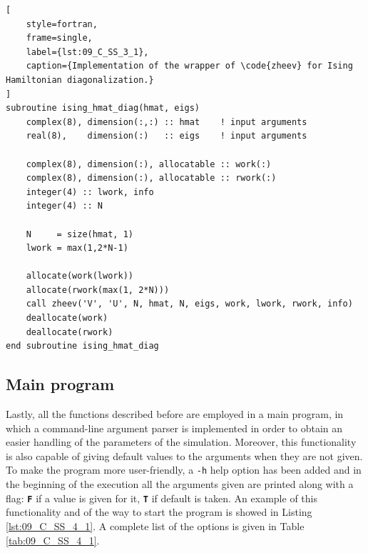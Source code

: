 \documentclass[pra, onecolumn, notitlepage, floats, 11pt]{revtex4-1}
\newcommand{\codebold}[2][cobalt]{\texttt{\bfseries {\color{#1}#2}}}
\newcommand{\code}[2][black]{\color{#1}\texttt{#2}}
\begin{document}
\begin{lstlisting}[
    style=fortran,
    frame=single,
    label={lst:09_C_SS_3_1},
    caption={Implementation of the wrapper of \code{zheev} for Ising Hamiltonian diagonalization.}
]
subroutine ising_hmat_diag(hmat, eigs)
    complex(8), dimension(:,:) :: hmat    ! input arguments
    real(8),    dimension(:)   :: eigs    ! input arguments

    complex(8), dimension(:), allocatable :: work(:)
    complex(8), dimension(:), allocatable :: rwork(:)
    integer(4) :: lwork, info
    integer(4) :: N

    N     = size(hmat, 1)
    lwork = max(1,2*N-1)

    allocate(work(lwork))
    allocate(rwork(max(1, 2*N)))
    call zheev('V', 'U', N, hmat, N, eigs, work, lwork, rwork, info)
    deallocate(work)
    deallocate(rwork)
end subroutine ising_hmat_diag
\end{lstlisting}



\subsection{Main program}
Lastly, all the functions described before are employed in a main program, in which a command-line argument parser is implemented in order to obtain an easier handling of the parameters of the simulation. Moreover, this functionality is also capable of giving default values to the arguments when they are not given.
To make the program more user-friendly, a \code{-h} help option has been added and in the beginning of the execution all the arguments given are printed along with a flag: \codebold[red]{F} if a value is given for it, \codebold[dartmouthgreen]{T} if default is taken. An example of this functionality and of the way to start the program is showed in Listing \ref{lst:09_C_SS_4_1}. A complete list of the options is given in Table \ref{tab:09_C_SS_4_1}.
\end{document}

